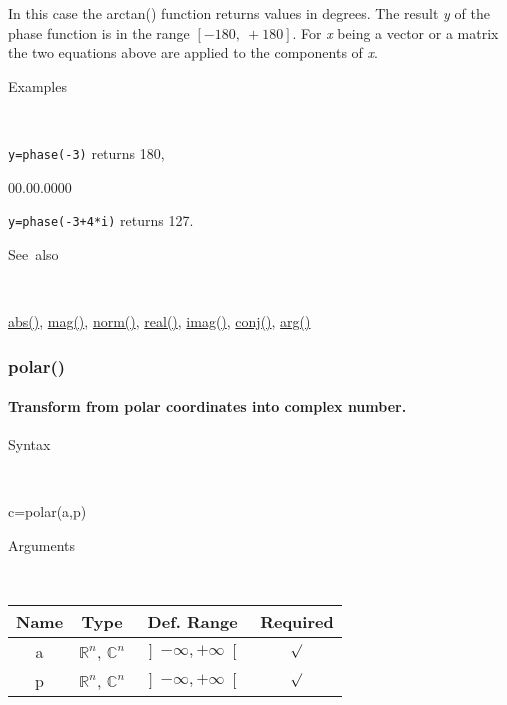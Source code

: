 In this case the arctan() function returns values in degrees. The
result \textit{y} of the phase function is in the range $\left[-180,\:+180\right]$.
For \textit{x} being a vector or a matrix the two equations above
are applied to the components of \textit{x}.

\begin{description}
\item [Examples]~
\end{description}
\texttt{y=phase(-3)} returns 180,

\begin{lyxlist}{00.00.0000}
\item [\texttt{y=phase(-3+4{*}i)}]returns 127.
\end{lyxlist}
\begin{description}
\item [See~also]~
\end{description}
\textcolor{blue}{\hyperlink{abs}{abs()}}, \textcolor{blue}{\hyperlink{mag}{mag()}},
\textcolor{blue}{\hyperlink{norm}{norm()}}, \textcolor{blue}{\hyperlink{real}{real()}},
\textcolor{blue}{\hyperlink{imag}{imag()}}, \textcolor{blue}{\hyperlink{conj}{conj()}},
\textcolor{blue}{\hyperlink{arg}{arg()}}


\newpage
\subsubsection*{\hypertarget{polar}{}{\Large polar()}}


\paragraph{\label{par:polar}Transform from polar coordinates into complex number.}

\begin{description}
\item [Syntax]~
\end{description}
c=polar(a,p)

\begin{description}
\item [Arguments]~
\end{description}
\begin{tabular}{|c|c|c|c|}
\hline 
Name&
Type&
Def. Range&
Required\tabularnewline
\hline
\hline 
a&
$\mathbb{R}^{n}$, $\mathbb{C}^{n}$&
$\left]-\infty,+\infty\right[$&
$\surd$\tabularnewline
\hline
p&
$\mathbb{R}^{n}$, $\mathbb{C}^{n}$&
$\left]-\infty,+\infty\right[$&
$\surd$\tabularnewline
\hline
\end{tabular}

